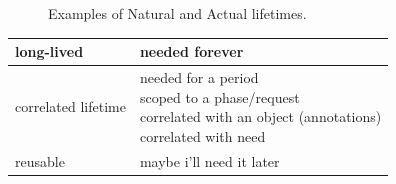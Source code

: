 \begin{figure}
	\centering
	\caption{Examples of Natural and Actual lifetimes.}
	\label{fig:typical-lifecycle}
\end{figure}


\begin{table}
\centering
\begin{tabular}{|l|l|} \hline
long-lived & needed forever \\ \hline 
correlated lifetime & \shortstack{needed for a period\\ 
scoped to a phase/request\\
correlated with an object (annotations)\\
correlated with need}\\ \hline
reusable & maybe i'll need it later \\ \hline
\end{tabular}
\end{table}

